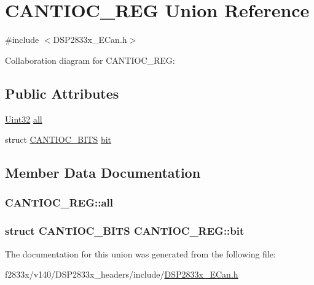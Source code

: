 \hypertarget{union_c_a_n_t_i_o_c___r_e_g}{}\section{C\+A\+N\+T\+I\+O\+C\+\_\+\+R\+E\+G Union Reference}
\label{union_c_a_n_t_i_o_c___r_e_g}


{\ttfamily \#include $<$D\+S\+P2833x\+\_\+\+E\+Can.\+h$>$}



Collaboration diagram for C\+A\+N\+T\+I\+O\+C\+\_\+\+R\+E\+G\+:
\subsection*{Public Attributes}
\begin{DoxyCompactItemize}
\item 
\hyperlink{_d_s_p2833x___device_8h_aba99025e657f892beb7ff31cecf64653}{Uint32} \hyperlink{union_c_a_n_t_i_o_c___r_e_g_a0e9ba0a2c0a1452cfa5a78392ebb4712}{all}
\item 
struct \hyperlink{struct_c_a_n_t_i_o_c___b_i_t_s}{C\+A\+N\+T\+I\+O\+C\+\_\+\+B\+I\+T\+S} \hyperlink{union_c_a_n_t_i_o_c___r_e_g_a331ba7698d83d944fc33068116d20fe2}{bit}
\end{DoxyCompactItemize}


\subsection{Member Data Documentation}
\hypertarget{union_c_a_n_t_i_o_c___r_e_g_a0e9ba0a2c0a1452cfa5a78392ebb4712}{}
\subsubsection[{all}]{ C\+A\+N\+T\+I\+O\+C\+\_\+\+R\+E\+G\+::all}\label{union_c_a_n_t_i_o_c___r_e_g_a0e9ba0a2c0a1452cfa5a78392ebb4712}
\hypertarget{union_c_a_n_t_i_o_c___r_e_g_a331ba7698d83d944fc33068116d20fe2}{}
\subsubsection[{bit}]{\setlength{\rightskip}{0pt plus 5cm}struct {\bf C\+A\+N\+T\+I\+O\+C\+\_\+\+B\+I\+T\+S} C\+A\+N\+T\+I\+O\+C\+\_\+\+R\+E\+G\+::bit}\label{union_c_a_n_t_i_o_c___r_e_g_a331ba7698d83d944fc33068116d20fe2}


The documentation for this union was generated from the following file\+:\begin{DoxyCompactItemize}
\item 
f2833x/v140/\+D\+S\+P2833x\+\_\+headers/include/\hyperlink{_d_s_p2833x___e_can_8h}{D\+S\+P2833x\+\_\+\+E\+Can.\+h}\end{DoxyCompactItemize}

